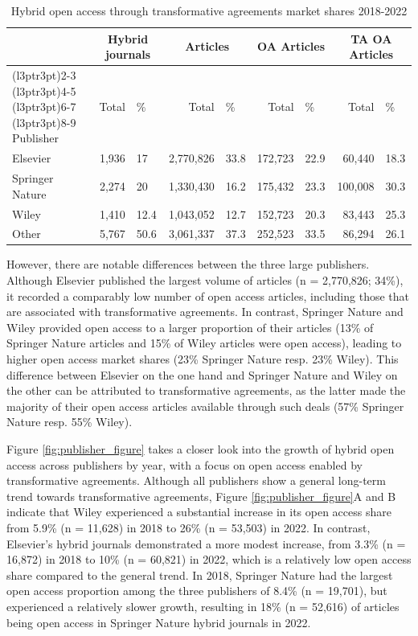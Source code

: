 \documentclass[a4paper,man,floatsintext,longtable,noextraspace,12pt]{apa6}
\begin{document}
\begin{table}[H]
\centering
\caption{\label{tab:publisher_league_table}Hybrid open access through transformative agreements market shares 2018-2022}
\centering
\begin{tabular}[t]{lrlrlrlrl}
\toprule
\multicolumn{1}{c}{ } & \multicolumn{2}{c}{Hybrid journals} & \multicolumn{2}{c}{Articles} & \multicolumn{2}{c}{OA Articles} & \multicolumn{2}{c}{TA OA Articles} \\
\cmidrule(l{3pt}r{3pt}){2-3} \cmidrule(l{3pt}r{3pt}){4-5} \cmidrule(l{3pt}r{3pt}){6-7} \cmidrule(l{3pt}r{3pt}){8-9}
Publisher & Total & \% & Total & \% & Total & \% & Total & \%\\
\midrule
Elsevier & 1,936 & 17 & 2,770,826 & 33.8 & 172,723 & 22.9 & 60,440 & 18.3\\
Springer Nature & 2,274 & 20 & 1,330,430 & 16.2 & 175,432 & 23.3 & 100,008 & 30.3\\
Wiley & 1,410 & 12.4 & 1,043,052 & 12.7 & 152,723 & 20.3 & 83,443 & 25.3\\
Other & 5,767 & 50.6 & 3,061,337 & 37.3 & 252,523 & 33.5 & 86,294 & 26.1\\
\bottomrule
\end{tabular}
\end{table}

However, there are notable differences between the three large
publishers. Although Elsevier published the largest volume of articles
(n = 2,770,826; 34\%), it recorded a comparably low number of open
access articles, including those that are associated with transformative
agreements. In contrast, Springer Nature and Wiley provided open access
to a larger proportion of their articles (13\% of Springer Nature
articles and 15\% of Wiley articles were open access), leading to higher
open access market shares (23\% Springer Nature resp. 23\% Wiley). This
difference between Elsevier on the one hand and Springer Nature and
Wiley on the other can be attributed to transformative agreements, as
the latter made the majority of their open access articles available
through such deals (57\% Springer Nature resp. 55\% Wiley).

Figure \ref{fig:publisher_figure} takes a closer look into the growth of
hybrid open access across publishers by year, with a focus on open
access enabled by transformative agreements. Although all publishers
show a general long-term trend towards transformative agreements, Figure
\ref{fig:publisher_figure}A and B indicate that Wiley experienced a
substantial increase in its open access share from 5.9\% (n = 11,628) in
2018 to 26\% (n = 53,503) in 2022. In contrast, Elsevier's hybrid
journals demonstrated a more modest increase, from 3.3\% (n = 16,872) in
2018 to 10\% (n = 60,821) in 2022, which is a relatively low open access
share compared to the general trend. In 2018, Springer Nature had the
largest open access proportion among the three publishers of 8.4\% (n =
19,701), but experienced a relatively slower growth, resulting in 18\%
(n = 52,616) of articles being open access in Springer Nature hybrid
journals in 2022.
\end{document}
